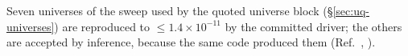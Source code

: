Seven universes of the sweep used by the quoted universe block (\S\ref{sec:uq-universes}) are reproduced to $\le1.4\times10^{-11}$ by the committed driver; the others are accepted by inference, because the same code produced them (Ref.~\cite{NoteRecords2026}, ).

